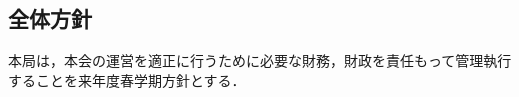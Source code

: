 \documentclass[a4paper,10pt]{jarticle}
\begin{document}
\subsection*{全体方針}

本局は，本会の運営を適正に行うために必要な財務，財政を責任もって管理執行することを来年度春学期方針とする．
\end{document}

